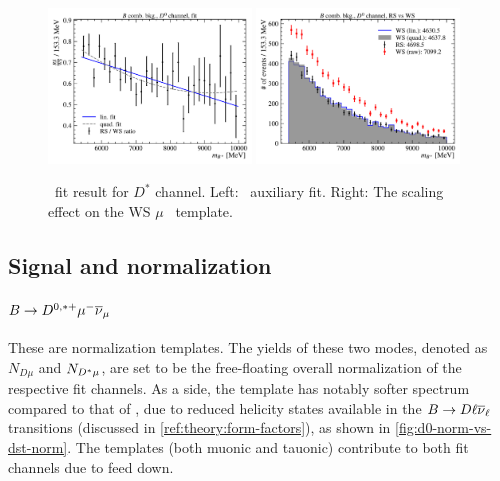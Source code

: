 \begin{figure}[htb]
    \centering
    \includegraphics[width=0.48\textwidth]{figs-fit-fit-templates/data-driven-plots/b_comb/fit_b_comb_d0_fit.pdf}
    \includegraphics[width=0.48\textwidth]{figs-fit-fit-templates/data-driven-plots/b_comb/fit_b_comb_d0_scaled.pdf}

    \caption{
        \BComb\ fit result for $D^*$ channel.
        Left: \BComb\ auxiliary fit.
        Right: The scaling effect on the WS $\mu$ \BComb\ template.
    }
    \label{fig:b-comb-d0}
\end{figure}


\subsection{Signal and normalization}
\label{tmpl:sig-norm}

\paragraph{$B \rightarrow D^{0,*+}{\mu^-}{{\overline{\nu}}_\mu}$}
These are normalization templates.
The yields of these two modes, denoted as $N_{D\mu}$ and $N_{{{D}^*}\mu}$,
are set to be the free-floating overall normalization of the respective
fit channels.
As a side, the \Dz\muon template has notably softer \qSq spectrum compared to
that of \Dstar\muon, due to reduced helicity states available in the
$B \rightarrow D \ell {\ensuremath{{\overline{\nu}}_\ell}}$ transitions
(discussed in \cref{ref:theory:form-factors}),
as shown in \cref{fig:d0-norm-vs-dst-norm}.
The \Dstarp templates (both muonic and tauonic) contribute to both fit channels
due to feed down.

